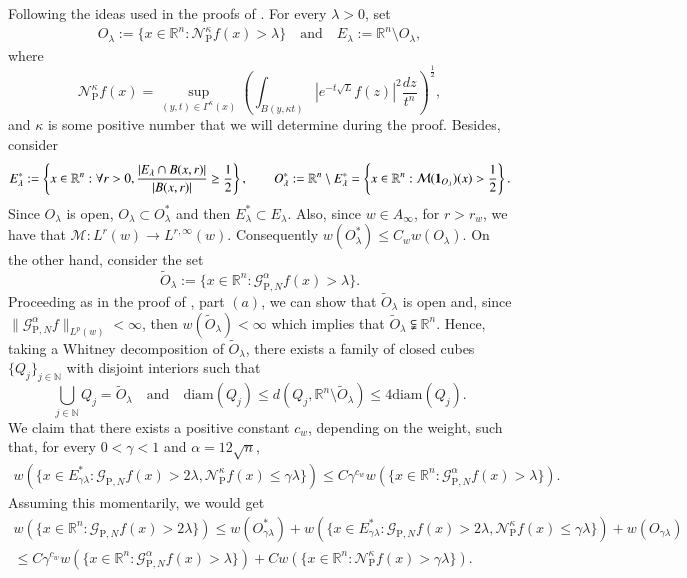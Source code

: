 \documentclass[11pt, a4paper,leqno]{amsart}
\renewcommand{\chi}{{\bf 1}}
\theoremstyle{plain}
\theoremstyle{definition}
\theoremstyle{remark}
\numberwithin{equation}{section}
\def \R{ \mathbb{R} }
\def \N{ \mathbb{N} }
\def \pp{ \mathrm{P} }
\def \Gcal { \mathcal{G} }
\def \Ncal { \mathcal{N} }
\begin{document}
Following the ideas used in the proofs of \cite[Theorems 6.1 and 7.1]{HofmannMayboroda}.
For every $\lambda>0$, set
\begin{align*}
O_{\lambda}:=\{x\in \mathbb{R}^n : \Ncal_{\pp}^{\kappa}f(x)>\lambda\} \quad \textrm{and} \quad
E_{\lambda}:=\mathbb{R}^n\setminus O_{\lambda},
\end{align*}
where
$$
\Ncal_{\pp}^{\kappa}f(x)=\sup_{(y,t)\in \Gamma^{\kappa}(x)}\left(\int_{B(y,\kappa t)}|e^{-t\sqrt{L}}f(z)|^2\frac{dz}{t^n}\right)^{\frac{1}{2}},
$$
and $\kappa$ is some positive number that we will determine during the proof.
Besides, consider 
\begin{align*}
E^*_{\lambda}:=\left\{x\in \mathbb{R}^n: \forall r>0, \frac{|E_{\lambda}\cap B(x,r)|}{|B(x,r)|}\geq \frac{1}{2}\right\}, \qquad O^*_{\lambda}:=\mathbb{R}^n \setminus E_{\lambda}^*=\left\{x\in \mathbb{R}^n : \mathcal{M}(\chi_{O_{\lambda}})(x)>\frac{1}{2}\right\}.
\end{align*}
Since $O_{\lambda}$ is open,  $O_{\lambda}\subset O_{\lambda}^*$ and then  $E_{\lambda}^*\subset E_{\lambda}$.
Also, since $w\in A_{\infty}$, for $r>r_w$, we have that  $\mathcal{M}:L^r(w)\rightarrow L^{r,\infty}(w)$. Consequently
$
w(O^*_{\lambda})\leq C_w w(O_{\lambda}).
$
On the other hand, consider the set
$$
\widetilde{O}_{\lambda}:=\{x\in \mathbb{R}^n : \Gcal_{\pp,N}^{\alpha}f(x)> \lambda\}.
$$
Proceeding as in the proof of \cite[Proposition 3.2]{MartellPrisuelos}, part $(a)$, we can show that $\widetilde{O}_{\lambda}$ is open and, since $\|\Gcal_{\pp,N}^{\alpha}f\|_{L^p(w)}<\infty$, then $w(\widetilde{O}_{\lambda})<\infty$ which implies that $\widetilde{O}_{\lambda}\subsetneqq \R^n$. Hence, taking a Whitney decomposition of $\widetilde{O}_{\lambda}$, there exists a family of closed cubes $\{Q_j\}_{j\in \N}$ with disjoint interiors such that
$$
\bigcup_{j\in \N}Q_j=\widetilde{O}_{\lambda} \quad \textrm{and} \quad\textrm{diam}(Q_j)
\leq d(Q_j,\mathbb{R}^n\setminus \widetilde{O}_{\lambda})\leq 4\textrm{diam}(Q_j).
$$
We claim that there exists a positive constant $c_w$, depending on the weight, such that, for every $0<\gamma<1$ and $\alpha=12\sqrt{n}$,
\begin{align}\label{wqj}
w(\{x\in E_{\gamma\lambda}^* : \Gcal_{\pp,N}f(x)>2\lambda, \Ncal_{\pp}^{\kappa}f(x)\leq \gamma \lambda\})\leq C\gamma^{c_w}w(\{x\in \mathbb{R}^n : \Gcal_{\pp,N}^{\alpha}f(x)> \lambda\}).
\end{align}
Assuming this momentarily,
we would get
\begin{multline*}
w(\{x\in \mathbb{R}^n : \Gcal_{\pp,N}f(x)>2\lambda\})
\leq w(O_{\gamma\lambda}^*)
+
w(\{x\in E_{\gamma\lambda}^* : \Gcal_{\pp,N}f(x)>2\lambda, \Ncal_{\pp}^{\kappa}f(x)\leq \gamma\lambda\})
+
w(O_{\gamma\lambda})
\\
\leq C\gamma^{c_w}w(\{x\in \mathbb{R}^n : \Gcal_{\pp,N}^{\alpha}f(x)> \lambda\})
+
Cw(\{x\in \mathbb{R}^n : \Ncal_{\pp}^{\kappa}f(x)>\gamma\lambda\}).
\end{multline*}
\end{document}
